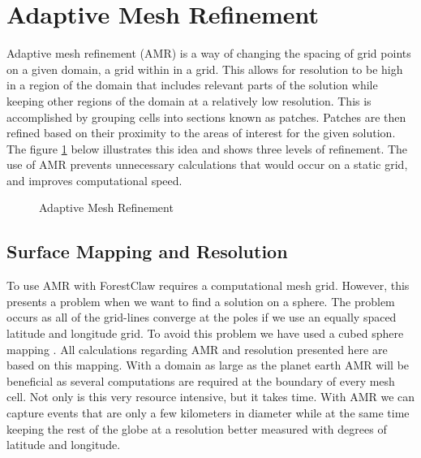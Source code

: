 \documentclass[twoside]{bsu-ms}
\newcommand{\fclaw}{ForestClaw\xspace}
\begin{document}
\section{Adaptive Mesh Refinement}\label{sec:2.4}
Adaptive mesh refinement (AMR) is a way of changing the spacing of grid points on a given domain, a grid within in a grid. This allows for resolution to be high in a region of the domain that includes relevant parts of the solution while keeping other regions of the domain at a relatively low resolution. This is accomplished by grouping cells into sections known as patches. Patches are then refined based on their proximity to the areas of interest for the given solution. The figure \ref{fig:2.1} below illustrates this idea and shows three levels of refinement. The use of AMR prevents unnecessary calculations that would occur on a static grid, and improves computational speed. 
\begin{figure}[!htbp]
	\centering

\caption{Adaptive Mesh Refinement}
\label{fig:2.1}
\end{figure}
\noindent 
\subsection{Surface Mapping and Resolution}\label{subsec:2.4.1}
To use AMR with \fclaw requires a computational mesh grid. However, this presents a problem when we want to find a solution on a sphere. The problem occurs as all of the grid-lines converge at the poles if we use an equally spaced latitude and longitude grid. To avoid this problem we have used a cubed sphere mapping \cite{calhoun2008logically}. All calculations regarding AMR and resolution presented here are based on this mapping. With a domain as large as the planet earth AMR will be beneficial as several computations are required at the boundary of every mesh cell. Not only is this very resource intensive, but it takes time. With AMR we can capture events that are only a few kilometers in diameter while at the same time keeping the rest of the globe at a resolution better measured with degrees of latitude and longitude. 
\end{document}
